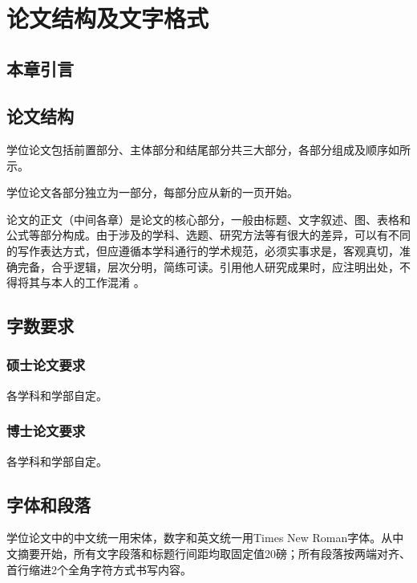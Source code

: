 \quad \\
\vspace{-20mm}

\section{论文结构及文字格式}



\subsection{本章引言}

\subsection{论文结构}

学位论文包括前置部分、主体部分和结尾部分共三大部分，各部分组成及顺序如所示。

学位论文各部分独立为一部分，每部分应从新的一页开始。

论文的正文（中间各章）是论文的核心部分，一般由标题、文字叙述、图、表格和公式等部分构成。由于涉及的学科、选题、研究方法等有很大的差异，可以有不同的写作表达方式，但应遵循本学科通行的学术规范，必须实事求是，客观真切，准确完备，合乎逻辑，层次分明，简练可读。引用他人研究成果时，应注明出处，不得将其与本人的工作混淆 。


\subsection{字数要求}

\subsubsection{硕士论文要求}

各学科和学部自定。

\subsubsection{博士论文要求}

各学科和学部自定。

\subsection{字体和段落}
学位论文中的中文统一用宋体，数字和英文统一用Times New Roman字体。从中文摘要开始，所有文字段落和标题行间距均取固定值20磅；所有段落按两端对齐、首行缩进2个全角字符方式书写内容。

